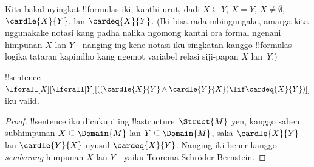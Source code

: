 \documentclass[../../../include/open-logic-section]{subfiles}
\begin{document}
Kita bakal nyingkat !!{formula}s iki, kanthi urut,
dadi $X \subseteq Y$, $X = Y$, $X \neq \emptyset$,
$\cardle{X}{Y}$, lan $\cardeq{X}{Y}$.
(Iki bisa rada mbingungake, amarga kita nggunakake notasi
kang padha nalika ngomong kanthi ora formal ngenani
himpunan $X$ lan $Y$---nanging ing kene notasi iku
singkatan kanggo !!{formula}s logika tataran kapindho
kang ngemot variabel relasi siji-papan $X$ lan~$Y$.)

\begin{prop}
!!{sentence} $\lforall[X][\lforall[Y][((\cardle{X}{Y} \land
    \cardle{Y}{X}) \lif \cardeq{X}{Y})]]$ iku valid.
\end{prop}

\begin{proof}
!!{sentence} iku dicukupi ing !!a{structure}~$\Struct{M}$
yen, kanggo saben subhimpunan $X \subseteq \Domain{M}$
lan $Y \subseteq \Domain{M}$, saka
$\cardle{X}{Y}$ lan $\cardle{Y}{X}$ nyusul
$\cardeq{X}{Y}$. Nanging iki bener kanggo
\emph{sembarang} himpunan $X$ lan $Y$---yaiku
Teorema Schr\"oder-Bernstein.
\end{proof}
\end{document}
